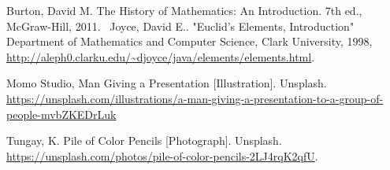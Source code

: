 \documentclass{article}
\begin{document}
\begin{thebibliography}{widest entry}
  Burton, David M. The History of Mathematics: An Introduction. 7th ed., McGraw-Hill, 2011. 
  Joyce, David E.. "Euclid's Elements, Introduction" Department of Mathematics and Computer Science, Clark University, 1998, \url{http://aleph0.clarku.edu/~djoyce/java/elements/elements.html}.
 
  Momo Studio, Man Giving a Presentation [Illustration]. Unsplash. \url{https://unsplash.com/illustrations/a-man-giving-a-presentation-to-a-group-of-people-mvbZKEDrLuk}
 
  Tungay, K. Pile of Color Pencils [Photograph]. Unsplash. \url{https://unsplash.com/photos/pile-of-color-pencils-2LJ4rqK2qfU}.
 
% 
%      
% 
\end{thebibliography}
\end{document}

